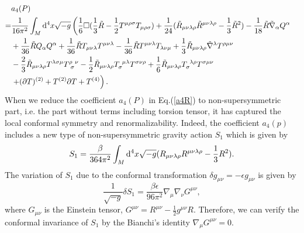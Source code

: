 \documentclass{ptephy}%
\begin{document}
\begin{align}
\lefteqn{a_4(P)}\nonumber \\
 = &  \frac{1}{16\pi^2}\int_M {\rm d}^4x\sqrt{-g}\left(
\frac{1}{6}\Box (\frac{1}{3}\tilde{R}-\frac{1}{2}T^{\mu\rho\sigma}T_{\mu\rho\sigma}) 
 +\frac{1}{24}(\tilde{R}_{\mu\nu\lambda\rho}\tilde{R}^{\mu\nu\lambda\rho}-\frac{1}{3}\tilde{R}^2)
-\frac{1}{18}\tilde{R}\tilde{\nabla}_\alpha Q^\alpha \right. \nonumber \\
& +\frac{1}{36}\tilde{R}Q_\alpha Q^\alpha +\frac{1}{36}\tilde{R}T_{\mu\nu\lambda}T^{\mu\nu\lambda}
-\frac{1}{36}\tilde{R}T^{\mu\nu\lambda}T_{\lambda\nu\mu} 
+\frac{1}{3}\tilde{R}_{\mu\nu\lambda\rho}\tilde{\nabla}^\lambda T^{\rho\mu\nu} \nonumber \\
& -\frac{2}{3}\tilde{R}_{\mu\nu\lambda\rho}T^{\lambda\sigma\mu}T^{\rho\ \nu}_{\ \sigma}
-\frac{1}{2}\tilde{R}_{\mu\nu\lambda\rho}T_\sigma^{\ \mu\lambda}T^{\sigma\nu\rho} 
+\frac{1}{6}\tilde{R}_{\mu\nu\lambda\rho}T_\sigma^{\ \lambda\rho}T^{\sigma\mu\nu} \nonumber \\
& \left. + (\partial T)^{(2)}+T^{(2)}\partial T + T^{(4)} \right). \label{a4R} 
\end{align}
When we reduce the coefficient $a_4(P)$ in Eq.(\ref{a4R}) to non-supersymmetric part,  
i.e. the part without terms including torsion tensor, 
it has captured the local conformal symmetry and renormalizability. Indeed, the coefficient $a_4(p)$  
includes a new type of non-supersymmetric gravity action 
$S_1$ which is given by 
\begin{equation}
S_1 = \frac{\beta}{364\pi^2}\int_M {\rm d}^4x\sqrt{-g}(R_{\mu\nu\lambda\rho}R^{\mu\nu\lambda\rho}
-\frac{1}{3}R^2). 
\end{equation} 
The variation of $S_1$ due to the conformal transformation $\delta g_{\mu\nu} = -\epsilon g_{\mu\nu}$ is given by 
\begin{equation}
\frac{1}{\sqrt{-g}}\delta S_1 = \frac{\beta\epsilon}{96\pi^2}\nabla_\mu\nabla_\nu G^{\mu\nu},
\end{equation}
where $G_{\mu\nu}$ is the Einstein tensor, $G^{\mu\nu}= R^{\mu\nu}-\frac{1}{2}g^{\mu\nu}R$.
Therefore, we can verify the conformal invariance of $S_1$ by the Bianchi's identity $\nabla_\mu G^{\mu\nu}=0$.
\end{document}

